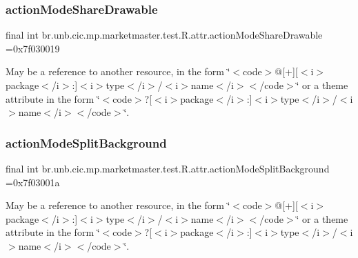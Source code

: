 \subsubsection{\texorpdfstring{action\+Mode\+Share\+Drawable}{actionModeShareDrawable}}
{\footnotesize\ttfamily final int br.\+unb.\+cic.\+mp.\+marketmaster.\+test.\+R.\+attr.\+action\+Mode\+Share\+Drawable =0x7f030019\hspace{0.3cm}{\ttfamily [static]}}

May be a reference to another resource, in the form \char`\"{}$<$code$>$@\mbox{[}+\mbox{]}\mbox{[}$<$i$>$package$<$/i$>$\+:\mbox{]}$<$i$>$type$<$/i$>$/$<$i$>$name$<$/i$>$$<$/code$>$\char`\"{} or a theme attribute in the form \char`\"{}$<$code$>$?\mbox{[}$<$i$>$package$<$/i$>$\+:\mbox{]}$<$i$>$type$<$/i$>$/$<$i$>$name$<$/i$>$$<$/code$>$\char`\"{}. \mbox{\label{classbr_1_1unb_1_1cic_1_1mp_1_1marketmaster_1_1test_1_1R_1_1attr_a0f0ee65b33074e619af438c42819554d}} 
\subsubsection{\texorpdfstring{action\+Mode\+Split\+Background}{actionModeSplitBackground}}
{\footnotesize\ttfamily final int br.\+unb.\+cic.\+mp.\+marketmaster.\+test.\+R.\+attr.\+action\+Mode\+Split\+Background =0x7f03001a\hspace{0.3cm}{\ttfamily [static]}}

May be a reference to another resource, in the form \char`\"{}$<$code$>$@\mbox{[}+\mbox{]}\mbox{[}$<$i$>$package$<$/i$>$\+:\mbox{]}$<$i$>$type$<$/i$>$/$<$i$>$name$<$/i$>$$<$/code$>$\char`\"{} or a theme attribute in the form \char`\"{}$<$code$>$?\mbox{[}$<$i$>$package$<$/i$>$\+:\mbox{]}$<$i$>$type$<$/i$>$/$<$i$>$name$<$/i$>$$<$/code$>$\char`\"{}. \mbox{\label{classbr_1_1unb_1_1cic_1_1mp_1_1marketmaster_1_1test_1_1R_1_1attr_af4003d50868c3f3183e388fd1626ddac}} 
